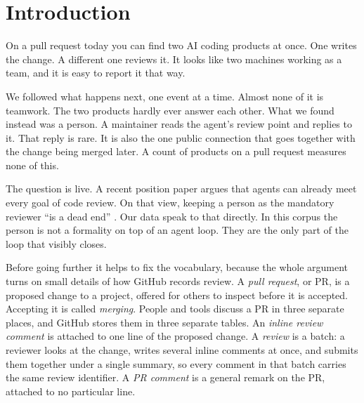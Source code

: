 \documentclass[lineno,pdflatex,sn-basic]{sn-jnl}
\begin{document}
\maketitle

\section{Introduction}\label{sec:introduction}

On a pull request today you can find two AI coding products at once. One writes
the change. A different one reviews it. It looks like two machines working as a
team, and it is easy to report it that way.

We followed what happens next, one event at a time. Almost none of it is
teamwork. The two products hardly ever answer each other. What we found instead
was a person. A maintainer reads the agent's review point and replies to it.
That reply is rare. It is also the one public connection that goes together with
the change being merged later. A count of products on a pull request measures
none of this.

The question is live. A recent position paper argues that agents can already meet every goal of code
review. On that view, keeping a person as the mandatory reviewer ``is a dead
end'' \citep{monperrus2026endofreview}. Our data speak to that directly. In this
corpus the person is not a formality on top of an agent loop. They are the only
part of the loop that visibly closes.

Before going further it helps to fix the vocabulary, because the whole argument
turns on small details of how GitHub records review. A \emph{pull request}, or
PR, is a proposed change to a project, offered for others to inspect before it is
accepted. Accepting it is called \emph{merging}. People and tools discuss a PR in
three separate places, and GitHub stores them in three separate tables. An
\emph{inline review comment} is attached to one line of the proposed change. A
\emph{review} is a batch: a reviewer looks at the change, writes several inline
comments at once, and submits them together under a single summary, so every
comment in that batch carries the same review identifier. A \emph{PR comment} is
a general remark on the PR, attached to no particular line.
\end{document}
